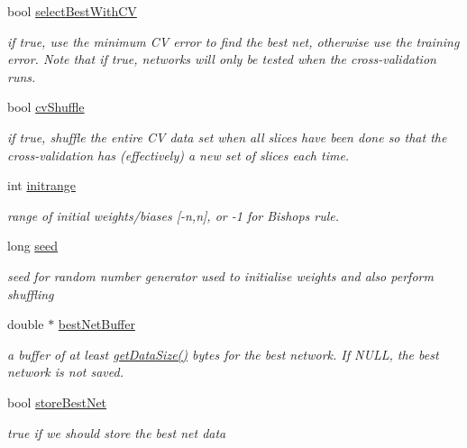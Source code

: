 \begin{DoxyCompactItemize}
bool \hyperlink{structNet_1_1SGDParams_afc048bab4c4091714af1d1e8453a340f}{select\+Best\+With\+CV}
\begin{DoxyCompactList}\small\item\em if true, use the minimum CV error to find the best net, otherwise use the training error. Note that if true, networks will only be tested when the cross-\/validation runs. \end{DoxyCompactList}\item 
bool \hyperlink{structNet_1_1SGDParams_abe9b79b9386b8c16c6e8eb4e2f623f49}{cv\+Shuffle}
\begin{DoxyCompactList}\small\item\em if true, shuffle the entire CV data set when all slices have been done so that the cross-\/validation has (effectively) a new set of slices each time. \end{DoxyCompactList}\item 
int \hyperlink{structNet_1_1SGDParams_a72a223aa181553352d9f607522448925}{initrange}
\begin{DoxyCompactList}\small\item\em range of initial weights/biases \mbox{[}-\/n,n\mbox{]}, or -\/1 for Bishop\textquotesingle{}s rule. \end{DoxyCompactList}\item 
long \hyperlink{structNet_1_1SGDParams_a66a44dda4f26cb33c3f787383a2a493b}{seed}
\begin{DoxyCompactList}\small\item\em seed for random number generator used to initialise weights and also perform shuffling \end{DoxyCompactList}\item 
double $\ast$ \hyperlink{structNet_1_1SGDParams_a2372741f5e570248863ca0cc254fb1c1}{best\+Net\+Buffer}
\begin{DoxyCompactList}\small\item\em a buffer of at least \hyperlink{classNet_a18dfc4bbf338d5167e787edefef8cd43}{get\+Data\+Size()} bytes for the best network. If N\+U\+LL, the best network is not saved. \end{DoxyCompactList}\item 
bool \hyperlink{structNet_1_1SGDParams_a518755a6c39fa50f2e5683c3f495f1d0}{store\+Best\+Net}
\begin{DoxyCompactList}\small\item\em true if we should store the best net data \end{DoxyCompactList}\end{DoxyCompactItemize}
